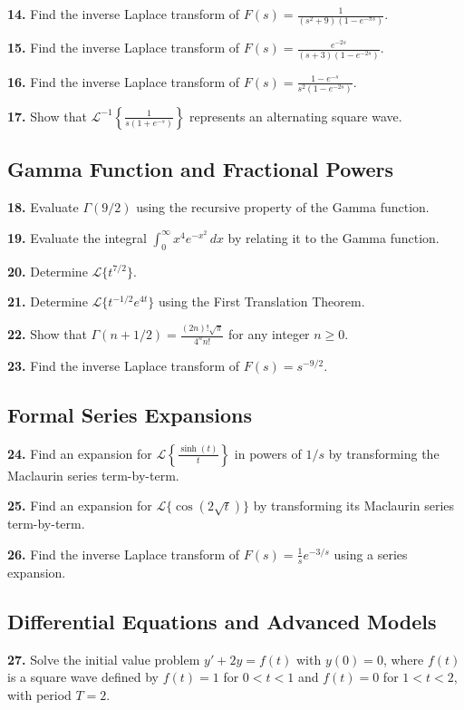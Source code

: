 \documentclass[11pt, letterpaper]{article}
\theoremstyle{definition}
\theoremstyle{remark}
\begin{document}
\textbf{14.} Find the inverse Laplace transform of $F(s) = \frac{1}{(s^2 + 9)(1 - e^{-\pi s})}$.

\textbf{15.} Find the inverse Laplace transform of $F(s) = \frac{e^{-2s}}{(s + 3)(1 - e^{-2s})}$.

\textbf{16.} Find the inverse Laplace transform of $F(s) = \frac{1 - e^{-s}}{s^2(1 - e^{-2s})}$.

\textbf{17.} Show that $\mathcal{L}^{-1} \left\{ \frac{1}{s(1 + e^{-s})} \right\}$ represents an alternating square wave.

\subsection{Gamma Function and Fractional Powers}
\textbf{18.} Evaluate $\Gamma(9/2)$ using the recursive property of the Gamma function.

\textbf{19.} Evaluate the integral $\int_0^\infty x^4 e^{-x^2} \,dx$ by relating it to the Gamma function.

\textbf{20.} Determine $\mathcal{L}\{t^{7/2}\}$.

\textbf{21.} Determine $\mathcal{L}\{t^{-1/2} e^{4t}\}$ using the First Translation Theorem.

\textbf{22.} Show that $\Gamma(n + 1/2) = \frac{(2n)! \sqrt{\pi}}{4^n n!}$ for any integer $n \ge 0$.

\textbf{23.} Find the inverse Laplace transform of $F(s) = s^{-9/2}$.

\subsection{Formal Series Expansions}
\textbf{24.} Find an expansion for $\mathcal{L} \left\{ \frac{\sinh(t)}{t} \right\}$ in powers of $1/s$ by transforming the Maclaurin series term-by-term.

\textbf{25.} Find an expansion for $\mathcal{L} \{\cos(2\sqrt{t})\}$ by transforming its Maclaurin series term-by-term.

\textbf{26.} Find the inverse Laplace transform of $F(s) = \frac{1}{s} e^{-3/s}$ using a series expansion.

\subsection{Differential Equations and Advanced Models}
\textbf{27.} Solve the initial value problem $y' + 2y = f(t)$ with $y(0) = 0$, where $f(t)$ is a square wave defined by $f(t) = 1$ for $0 < t < 1$ and $f(t) = 0$ for $1 < t < 2$, with period $T = 2$.
\end{document}

